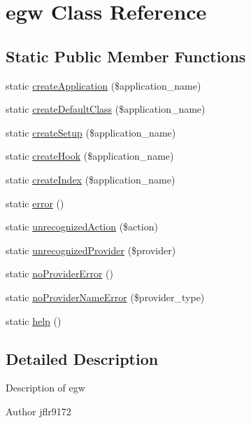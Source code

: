 \hypertarget{classegw}{
\section{egw Class Reference}
\label{classegw}
}
\subsection*{Static Public Member Functions}
\begin{DoxyCompactItemize}
\item 
static \hyperlink{classegw_a9ba967a1fb1aaaa8f44cf9bcbf3688ae}{createApplication} (\$application\_\-name)
\item 
static \hyperlink{classegw_ae56eca08292f4e5f52380e6a161d6d72}{createDefaultClass} (\$application\_\-name)
\item 
static \hyperlink{classegw_a5875fbc00fd0375ba6c8daf923da1a26}{createSetup} (\$application\_\-name)
\item 
static \hyperlink{classegw_ac53872505e1ae6197000bf254fe9712b}{createHook} (\$application\_\-name)
\item 
static \hyperlink{classegw_afe2fbca78672c8b7359aaee7ad2951b3}{createIndex} (\$application\_\-name)
\item 
static \hyperlink{classegw_a4b57da58420cc69c3f68716cfed1c000}{error} ()
\item 
static \hyperlink{classegw_ab244791d7a1e0e3ea56698a3330e6193}{unrecognizedAction} (\$action)
\item 
static \hyperlink{classegw_ae6db8538d2c1211717b469b8b6d6b916}{unrecognizedProvider} (\$provider)
\item 
static \hyperlink{classegw_a094de8a99539ed16bfcfa02cca96ebe6}{noProviderError} ()
\item 
static \hyperlink{classegw_abdbb7004acfd7445fc6a09e9cfe5f325}{noProviderNameError} (\$provider\_\-type)
\item 
static \hyperlink{classegw_ac70cba8b05c8c26992fc0d88593ee619}{help} ()
\end{DoxyCompactItemize}


\subsection{Detailed Description}
Description of egw

\begin{DoxyAuthor}{Author}
jflr9172 
\end{DoxyAuthor}


